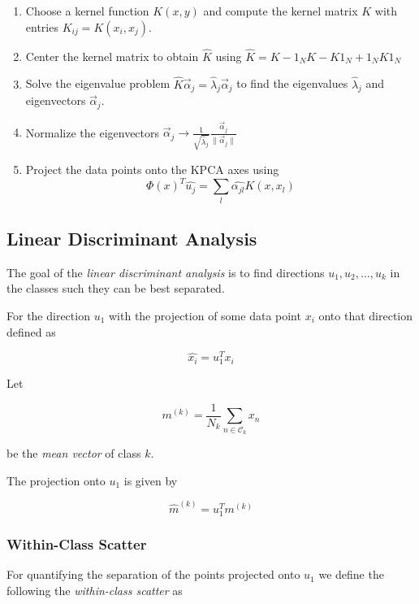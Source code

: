 \begin{enumerate}

    \item Choose a kernel function \(K(x, y)\) and compute the kernel matrix \(K\) with entries \(K_{ij} = K(x_i, x_j)\).

    \item Center the kernel matrix to obtain \(\hat{K}\) using \(\hat{K} = K - 1_N K - K 1_N + 1_N K 1_N\)

    \item Solve the eigenvalue problem \(\hat{K} \vec{\alpha}_j = \hat{\lambda}_j \vec{\alpha}_j\) to find the eigenvalues \(\hat{\lambda}_j\) and eigenvectors \(\vec{\alpha}_j\).

    \item Normalize the eigenvectors \(\vec{\alpha}_j \to \frac{1}{\sqrt{\hat{\lambda}_j}} \frac{\vec{\alpha}_j}{\|\vec{\alpha}_j\|}\)

    \item Project the data points onto the KPCA axes using
    \[
        \Phi(x)^T \hat{u_j} = \sum_{l} \hat{\alpha_{jl}} K(x, x_l)
    \]

\end{enumerate}

\subsection{Linear Discriminant Analysis}

The goal of the \emph{linear discriminant analysis} is to find directions \(u_1, u_2, \ldots, u_k\) in the classes such they can be best separated. 

For the direction \(u_1\) with the projection of some data point \(x_i\) onto that direction defined as

\[
    \hat{x_i} = u_1^T x_i
\]

Let 

\[
    m^{(k)} = \frac{1}{N_k} \sum_{n \in \mathcal{C}_k} x_n
\]

be the \emph{mean vector} of class \(k\). 

The projection onto \(u_1\) is given by 

\[
    \hat{m}^{(k)} = u_1^T m^{(k)}
\]

\subsubsection*{Within-Class Scatter}

For quantifying the separation of the points projected onto \(u_1\) we define the following
the \emph{within-class scatter} as 

